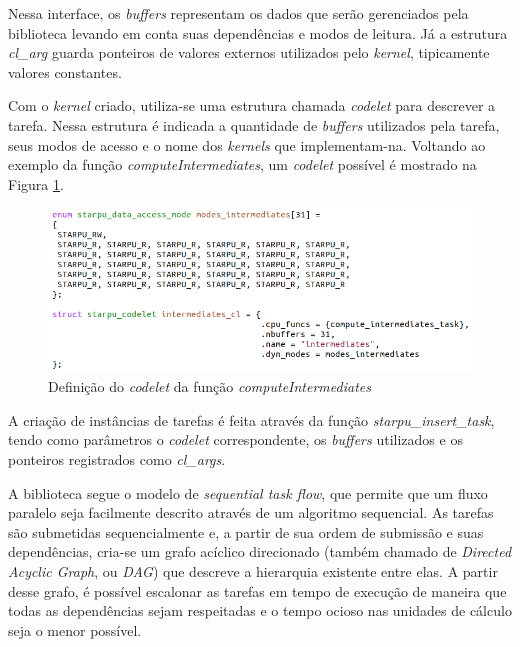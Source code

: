 \documentclass[cic,tc]{iiufrgs}
\begin{document}
Nessa interface, os \textit{buffers} representam os dados que serão gerenciados pela biblioteca levando em conta suas dependências e modos de leitura. Já a estrutura
\textit{cl\_arg} guarda ponteiros de valores externos utilizados pelo \textit{kernel}, tipicamente valores constantes.

Com o \textit{kernel} criado, utiliza-se uma estrutura chamada \textit{codelet} para descrever a tarefa. Nessa estrutura é indicada a quantidade de \textit{buffers} utilizados
pela tarefa, seus modos de acesso e o nome dos \textit{kernels} que implementam-na. Voltando ao exemplo da função \textit{computeIntermediates}, um \textit{codelet}
possível é mostrado na Figura \ref{fig:intermediates_cl}.

\begin{figure}[!htb]
    \caption{Definição do \textit{codelet} da função \textit{computeIntermediates}}
    \begin{center}
      \includegraphics[width=32em]{intermediates_cl}
    \end{center}
    \label{fig:intermediates_cl}
\end{figure}

A criação de instâncias de tarefas é feita através da função \textit{starpu\_insert\_task}, tendo como parâmetros o \textit{codelet} correspondente, os \textit{buffers} utilizados e
os ponteiros registrados como \textit{cl\_args}. 

A biblioteca segue o modelo de \textit{sequential task flow}, que permite que um fluxo paralelo seja facilmente descrito através de um algoritmo sequencial. As tarefas são submetidas
sequencialmente e, a partir de sua ordem de submissão e suas dependências, cria-se um grafo acíclico direcionado (também chamado de \textit{Directed Acyclic Graph}, ou \textit{DAG})
que descreve a hierarquia existente entre elas. A partir desse grafo, é possível escalonar as tarefas em tempo de execução de maneira que todas as dependências sejam respeitadas e o
tempo ocioso nas unidades de cálculo seja o menor possível.
\end{document}
